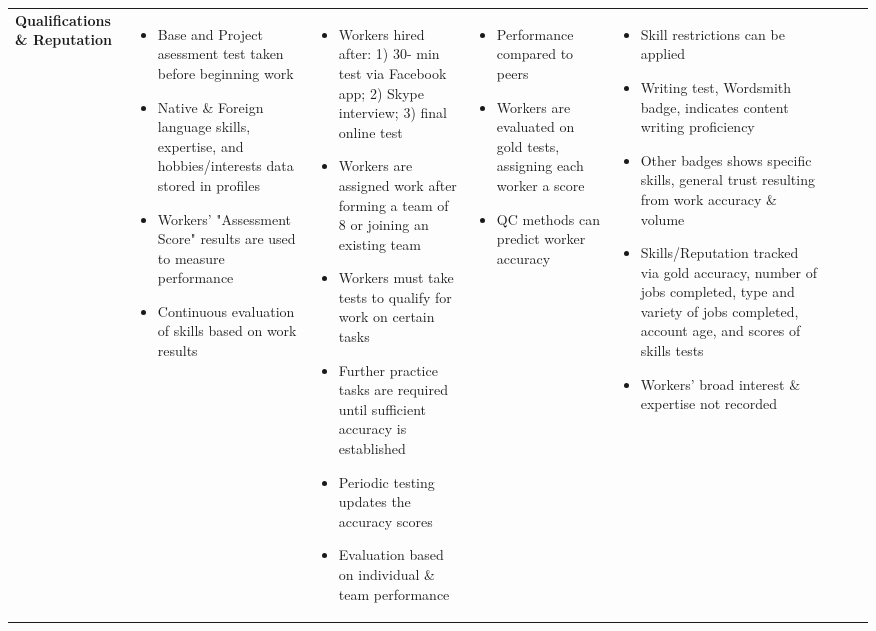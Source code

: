 \documentclass{sigchi}
\begin{document}
\begin{sidewaystable*}
\begin{tabular}[h]{| p{1.5cm}| p{2.7cm}| p{2.7cm}| p{2.7cm}| p{2.7cm}| p{2.7cm}| p{2.7cm}| p{2.7cm}|}
{\bf Qualifications \&  Reputation
} & 
{
\begin{itemize} [noitemsep,nolistsep]
\item  Base and Project asessment test taken before beginning work
\item  Native \& Foreign language skills, expertise, and hobbies/interests data stored in profiles
\item  Workers' "Assessment Score" results are used to measure performance
\item  Continuous evaluation of skills based on work results
\end{itemize}
} &
{
\begin{itemize} [noitemsep,nolistsep]
\item  Workers hired after: 1) 30- min test via Facebook app; 2) Skype interview; 3) final online test
\item  Workers are assigned work after forming a team of 8 or joining an existing team
\item  Workers must take tests to qualify for work on certain tasks
\item  Further practice tasks are required until sufficient accuracy is established
\item  Periodic testing updates the accuracy scores
\item  Evaluation based on individual \& team performance
\end{itemize}
} &
{
\begin{itemize} [noitemsep,nolistsep]
\item  Performance compared to peers
\item  Workers are evaluated on gold tests, assigning each worker a score
\item  QC methods can predict worker accuracy
\end{itemize}
} &
{
\begin{itemize} [noitemsep,nolistsep]
\item  Skill restrictions can be applied
\item  Writing test, Wordsmith badge, indicates content writing proficiency
\item  Other badges shows specific skills, general trust resulting from work accuracy \& volume
\item  Skills/Reputation tracked via gold accuracy, number of jobs completed, type and variety of jobs completed, account age, and scores of skills tests
\item  Workers' broad interest \& expertise not recorded
\end{itemize}
}
\end{tabular}
\end{sidewaystable*}
\end{document}
